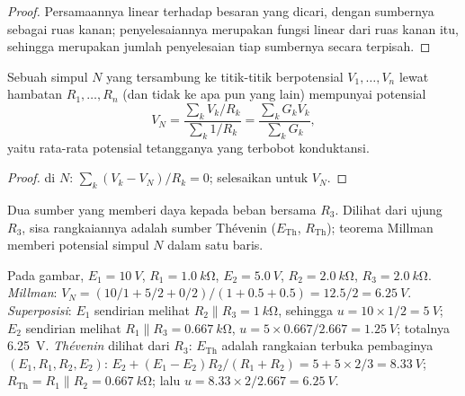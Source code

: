 \begin{proof}
Persamaannya linear terhadap besaran yang dicari, dengan sumbernya
sebagai ruas kanan; penyelesaiannya merupakan fungsi linear dari ruas
kanan itu, sehingga merupakan jumlah penyelesaian tiap sumbernya secara terpisah.
\end{proof}

\begin{proposition}\label{prop:b1:dc-circuits:millman}
Sebuah simpul $N$ yang tersambung ke titik-titik berpotensial
$V_1, \dots, V_n$ lewat hambatan $R_1, \dots, R_n$ (dan tidak ke apa pun
yang lain) mempunyai potensial
\[
V_N = \frac{\sum_k V_k/R_k}{\sum_k 1/R_k} = \frac{\sum_k G_k V_k}{\sum_k G_k},
\]
yaitu rata-rata potensial tetangganya yang terbobot konduktansi.
\end{proposition}

\begin{proof}
 di $N$: $\sum_k (V_k - V_N)/R_k = 0$; selesaikan untuk $V_N$.
\end{proof}

\begin{omfigure}

{\small Dua sumber yang memberi daya kepada beban bersama $R_3$. Dilihat
dari ujung $R_3$, sisa rangkaiannya adalah sumber Thévenin
($E_{\mathrm{Th}}$, $R_{\mathrm{Th}}$); teorema Millman memberi
potensial simpul $N$ dalam satu baris.}
\end{omfigure}

\begin{example}\label{ex:b1:dc-circuits:threeways}
Pada gambar, $E_1 = \qty{10}{V}$, $R_1 = \qty{1.0}{k\ohm}$, $E_2 =
\qty{5.0}{V}$, $R_2 = \qty{2.0}{k\ohm}$, $R_3 = \qty{2.0}{k\ohm}$.
\emph{Millman}: $V_N = (10/1 + 5/2 + 0/2)/(1 + 0.5 + 0.5) = 12.5/2 =
\qty{6.25}{V}$. \emph{Superposisi}: $E_1$ sendirian melihat $R_2 \parallel
R_3 = \qty{1}{k\ohm}$, sehingga $u = 10 \times 1/2 = \qty{5}{V}$; $E_2$
sendirian melihat $R_1 \parallel R_3 = \qty{0.667}{k\ohm}$, $u = 5 \times 0.667/2.667
= \qty{1.25}{V}$; totalnya \qty{6.25}{V}. \emph{Thévenin} dilihat dari
$R_3$: $E_{\mathrm{Th}}$ adalah  rangkaian terbuka pembaginya
$(E_1, R_1, R_2, E_2)$: $E_2 + (E_1 - E_2)R_2/(R_1 + R_2) = 5 + 5 \times
2/3 = \qty{8.33}{V}$; $R_{\mathrm{Th}} = R_1 \parallel R_2 =
\qty{0.667}{k\ohm}$; lalu $u = 8.33 \times 2/2.667 = \qty{6.25}{V}$.
\end{example}

